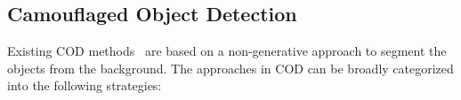 \documentclass{ecai}
\begin{document}
\subsection{Camouflaged Object Detection}
Existing COD methods~\cite{Dong2023a, fan2021concealed, fan2020camouflaged} are based on a non-generative approach to segment the objects from the background. The approaches in COD can be broadly categorized into the following strategies:
\end{document}

